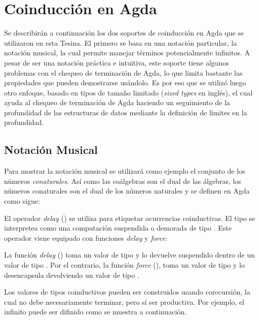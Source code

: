 \section{Coinducción en Agda}\label{coind:agda}

Se describirán a continuación los dos soportes de coinducción en Agda que se utilizaron en esta Tesina. El primero se basa en una notación particular, la notación musical, la cual permite manejar términos potencialmente infinitos. A pesar de ser una notación práctica e intuitiva, este soporte tiene algunos problemas con el chequeo de terminación de Agda, lo que limita bastante las propiedades que pueden demostrarse usándolo. Es por eso que se utilizó luego otro enfoque, basado en tipos de tamaño limitado (\textit{sized types} en inglés), el cual ayuda al chequeo de terminación de Agda haciendo un seguimiento de la profundidad de las estructuras de datos mediante la definición de límites en la profundidad. 

\subsection{Notación Musical}\label{coind:agda:musical}

Para mostrar la notación musical se utilizará como ejemplo el conjunto de los números \textit{conaturales}. Así como las coálgebras son el dual de las álgebras, los números conaturales son el dual de los números naturales y se definen en Agda como sigue:


El operador \textit{delay} (\AgdaDatatype{$\infty$}) se utiliza para etiquetar ocurrencias coinductivas. El tipo  se interpretea como una computación suspendida o demorada de tipo . Este operador viene equipado con funciones \textit{delay} y \textit{force}:


La función \textit{delay} (\AgdaFunction{$\sharp\_$}) toma un valor de tipo  y lo devuelve suspendido dentro de un valor de tipo . Por el contrario, la función \textit{force} (\AgdaFunction{$\flat$}), toma un valor de tipo  y lo desencapsula devolviendo un valor de tipo .

Los valores de tipos coinductivos pueden ser construidos usando corecursión, la cual no debe necesariamente terminar, pero sí ser productiva. Por ejemplo, el infinito puede ser difinido como se muestra a continuación.

